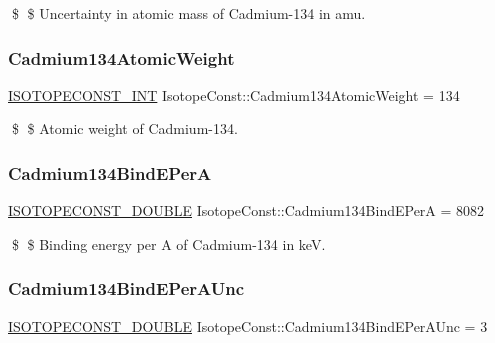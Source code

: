 \$ \$ Uncertainty in atomic mass of Cadmium-\/134 in amu. \mbox{\label{group___isotope_const-_cadmium-_cd134_ga45889cb9a214b89f4a9d779f9e08e132}} 
\subsubsection{\texorpdfstring{Cadmium134\+Atomic\+Weight}{Cadmium134AtomicWeight}}
{\footnotesize\ttfamily \mbox{\hyperlink{group___isotope_const-_macros_ga5f18360b3e99483a35c32d789e62621c}{I\+S\+O\+T\+O\+P\+E\+C\+O\+N\+S\+T\+\_\+\+I\+NT}} Isotope\+Const\+::\+Cadmium134\+Atomic\+Weight = 134}

\$ \$ Atomic weight of Cadmium-\/134. \mbox{\label{group___isotope_const-_cadmium-_cd134_ga6527965a37eb37dfc3875127998c60cc}} 
\subsubsection{\texorpdfstring{Cadmium134\+Bind\+E\+PerA}{Cadmium134BindEPerA}}
{\footnotesize\ttfamily \mbox{\hyperlink{group___isotope_const-_macros_ga8f45a7272ce02c0b4c65c44636ed719a}{I\+S\+O\+T\+O\+P\+E\+C\+O\+N\+S\+T\+\_\+\+D\+O\+U\+B\+LE}} Isotope\+Const\+::\+Cadmium134\+Bind\+E\+PerA = 8082}

\$ \$ Binding energy per A of Cadmium-\/134 in keV. \mbox{\label{group___isotope_const-_cadmium-_cd134_gaffac2de77c473b7ce1ae77cfcea5536a}} 
\subsubsection{\texorpdfstring{Cadmium134\+Bind\+E\+Per\+A\+Unc}{Cadmium134BindEPerAUnc}}
{\footnotesize\ttfamily \mbox{\hyperlink{group___isotope_const-_macros_ga8f45a7272ce02c0b4c65c44636ed719a}{I\+S\+O\+T\+O\+P\+E\+C\+O\+N\+S\+T\+\_\+\+D\+O\+U\+B\+LE}} Isotope\+Const\+::\+Cadmium134\+Bind\+E\+Per\+A\+Unc = 3}

